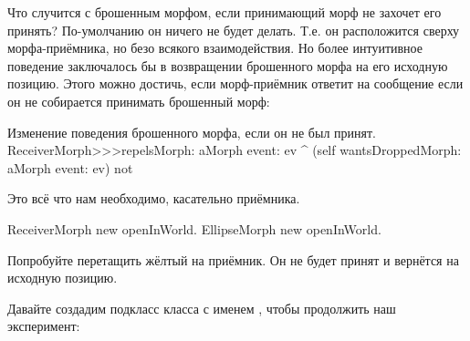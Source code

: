 \documentclass[a4paper,10pt,twoside]{book}
\begin{document}
Что случится с брошенным морфом, если принимающий морф не захочет его принять? По-умолчанию он ничего не будет делать. Т.е. он расположится сверху морфа-приёмника, но безо всякого взаимодействия. Но более интуитивное поведение заключалось бы в возвращении брошенного морфа на его исходную позицию. Этого можно достичь, если морф-приёмник ответит  на сообщение  если он не собирается принимать брошенный морф:

\begin{method}{Изменение поведения брошенного морфа, если он не был принят.}
ReceiverMorph>>>repelsMorph: aMorph event: ev
	^ (self wantsDroppedMorph: aMorph event: ev) not
\end{method}

Это всё что нам необходимо, касательно приёмника.

\begin{code}{}
ReceiverMorph new openInWorld.
EllipseMorph new openInWorld.
\end{code}
\noindent
Попробуйте перетащить жёлтый  на приёмник. Он не будет принят и вернётся на исходную позицию.


Давайте создадим подкласс класса  с именем , чтобы продолжить наш эксперимент:
\end{document}
